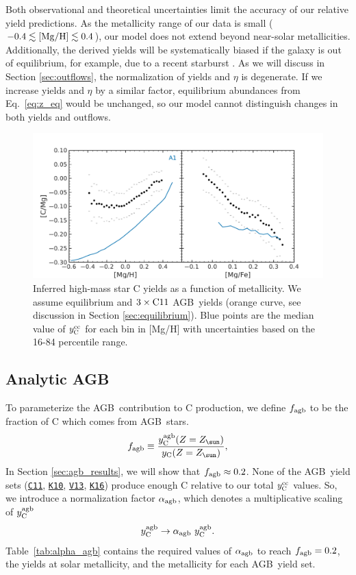 \documentclass[fleqn,usenatbib]{mnras}
\newcommand{\cxi}{\texttt{\hyperlink{C11}{C11}}}
\newcommand{\kx}{\texttt{\hyperlink{K10}{K10}}}
\newcommand{\kxvi}{\texttt{\hyperlink{K16}{K16}}}
\newcommand{\vxiii}{\texttt{\hyperlink{V13}{V13}}}
\newcommand{\agb}{AGB}
\newcommand{\Yct}{\ensuremath{y_{\rm C}}}
\newcommand{\Ycc}{\ensuremath{y_{\rm C}^{\rm cc}}}
\newcommand{\Ycagb}{\ensuremath{y_{\rm C}^{\rm agb}}}
\newcommand{\Zo}{%
    \ifmmode Z_{\sun}%
    \else $Z_{\sun}$%
    \fi}
\begin{document}
Both observational and theoretical uncertainties limit the accuracy of our relative yield predictions.
As the metallicity range of our data is small ($-0.4\lesssim {\rm [Mg/H]} \lesssim 0.4$),
our model does not extend beyond near-solar metallicities.
Additionally, the derived yields will be systematically biased if the galaxy is out of equilibrium, for example, due to a recent starburst \citep{mor+19,isern19}. 
As we will discuss in Section \ref{sec:outflows}, the normalization of yields and $\eta$ is degenerate. If we increase yields and $\eta$ by a similar factor, equilibrium abundances from Eq.~\ref{eq:z_eq} would be unchanged, so our model cannot distinguish changes in both yields and outflows.

\begin{figure}
    \centering
    \includegraphics{analytic.pdf}
    \caption[]{Inferred high-mass star C yields as a function of metallicity. We assume equilibrium and $3\times {\rm C11}$ \agb\ yields (orange curve, see discussion in Section \ref{sec:equilibrium}). Blue points are the median value of $\Ycc$ for each bin in [Mg/H] with uncertainties based on the 16-84 percentile range.
    }
    \label{fig:analytic}
\end{figure}



\subsection{Analytic AGB}

To parameterize the \agb\ contribution to C production, we define $f_{\rm agb}$ to be the fraction of C which comes from \agb\ stars. 
\begin{equation}\label{eq:f_agb}
    f_{\rm agb} \equiv \frac{\Ycagb(Z=\Zo)}{\Yct(Z=\Zo)},
\end{equation}
In Section \ref{sec:agb_results}, we will show that $f_{\rm agb} \approx 0.2$. 
None of the \agb\ yield sets (\cxi{}, \kx{}, \vxiii{}, \kxvi{}) produce enough C relative to our total $\Ycc$ values. So, we introduce a normalization factor $\alpha_{\rm agb}$, which denotes a multiplicative scaling of $\Ycagb$ 
\begin{equation} \label{eq:alpha}
        \Ycagb \rightarrow \alpha_{\rm agb}\ \Ycagb.
\end{equation}
Table~\ref{tab:alpha_agb} contains the required values of $\alpha_{\rm agb}$ to reach $f_{\rm agb}=0.2$, the yields at solar metallicity, and the metallicity for each \agb\ yield set. 
\end{document}
